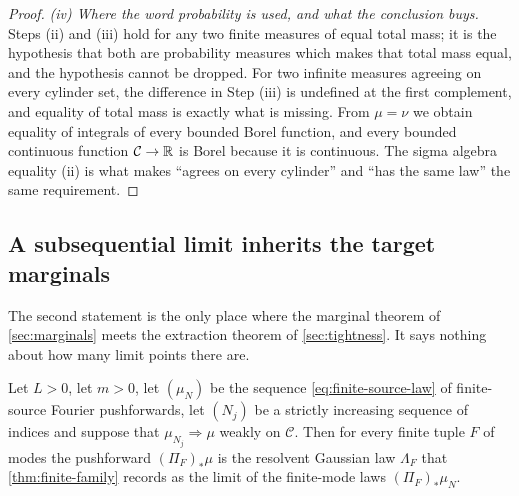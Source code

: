 \begin{proof}
\emph{(iv) Where the word probability is used, and what the conclusion buys.}
Steps (ii) and (iii) hold for any two finite measures of equal total mass; it is
the hypothesis that both are probability measures which makes that total mass
equal, and the hypothesis cannot be dropped. For two infinite measures agreeing
on every cylinder set, the difference in Step (iii) is undefined at the first
complement, and equality of total mass is exactly what is missing. From
$\mu=\nu$ we obtain equality of integrals of every bounded Borel function, and
every bounded continuous function $\mathcal C\to\mathbb{R}$ is Borel because it is
continuous. The sigma algebra equality (ii) is what makes ``agrees on every
cylinder'' and ``has the same law'' the same requirement.
\end{proof}

\subsection{A subsequential limit inherits the target marginals}

The second statement is the only place where the marginal theorem of
\cref{sec:marginals} meets the extraction theorem of \cref{sec:tightness}. It
says nothing about how many limit points there are.

\begin{lemma}\label{lem:subsequence-marginals}
Let $L>0$, let $m>0$, let $(\mu_N)$ be the sequence \eqref{eq:finite-source-law}
of finite-source Fourier pushforwards, let $(N_j)$ be a strictly increasing
sequence of indices and suppose that $\mu_{N_j}\Rightarrow\mu$ weakly on
$\mathcal C$. Then for every finite tuple $F$ of modes the pushforward
$(\Pi_F)_*\mu$ is the resolvent Gaussian law $\Lambda_F$ that
\cref{thm:finite-family} records as the limit of the finite-mode laws
$(\Pi_F)_*\mu_N$.
\end{lemma}

